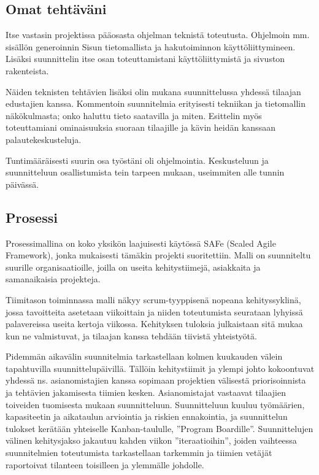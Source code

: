 \documentclass{article}
\begin{document}
\subsection{Omat tehtäväni}

Itse vastasin projektissa pääosasta ohjelman teknistä toteutusta. Ohjelmoin mm.
sisällön generoinnin Sisun tietomallista ja hakutoiminnon käyttöliittymineen.
Lisäksi suunnittelin itse osan toteuttamistani käyttöliittymistä ja sivuston
rakenteista.

Näiden teknisten tehtävien lisäksi olin mukana suunnittelussa yhdessä tilaajan
edustajien kanssa. Kommentoin suunnitelmia erityisesti tekniikan ja tietomallin
näkökulmasta; onko haluttu tieto saa\-ta\-vil\-la ja mi\-ten. Esittelin myös
toteuttamiani ominaisuuksia suoraan tilaajille ja kävin heidän kans\-saan
palaute\-kes\-kus\-teluja.

Tuntimääräisesti suurin osa työstäni oli ohjelmointia. Keskusteluun ja
suunnitteluun osallistumista tein tarpeen mukaan, useimmiten alle tunnin
päivässä.

\subsection{Prosessi}

Prosessimallina on koko yksikön laajuisesti käytössä SAFe (Scaled Agile
Framework), jonka mu\-kai\-ses\-ti tämäkin projekti suoritettiin. Malli on
suunniteltu suurille organisaatioille, joilla on useita kehitystiimejä,
asiakkaita ja samanaikaisia projekteja.

Tiimitason toiminnassa malli näkyy scrum-tyyppisenä nopeana kehityssyklinä,
jossa tavoitteita ase\-tetaan viikoittain ja niiden toteutumista seurataan
lyhyissä palavereissa useita kertoja viikossa. Kehityksen tuloksia julkaistaan
sitä mukaa kun ne valmistuvat, ja tilaajan kanssa tehdään tiivistä
yhteis\-työtä.

Pidemmän aikavälin suunnitelmia tarkastellaan kolmen kuukauden välein
tapahtuvilla suunnittelu\-päivillä. Tällöin kehitystiimit ja ylempi johto
kokoontuvat yhdessä ns. asianomistajien kanssa sopimaan projektien välisestä
priorisoinnista ja tehtävien jakamisesta tiimien kesken. Asianomistajat
vastaavat tilaajien toiveiden tuomisesta mukaan suunnitteluun. Suunnitteluun
kuuluu työmäärien, kapasiteetin ja aikataulun arviointia ja riskien
ennakointia, ja suunnittelun tulokset kerätään yhtei\-selle Kanban-taululle,
''Program Boardille''.  Suunnittelujen välinen kehitysjakso jakautuu kahden
viikon ''iteraatioihin'', joiden vaihteessa suunnitelmien toteutumista
tarkastellaan tarkemmin ja tii\-mien vetä\-jät raportoivat tilanteen toisilleen
ja ylemmälle johdolle.
\end{document}
